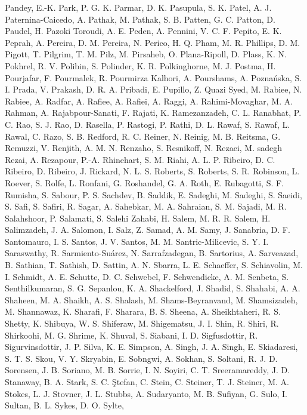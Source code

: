 \documentclass[
  letterpaper,
  DIV=11,
  numbers=noendperiod]{scrartcl}
\newlength{\cslhangindent}
\newenvironment{CSLReferences}[2] %
 {\begin{list}{}{%
  \setlength{\itemindent}{0pt}
  \setlength{\leftmargin}{0pt}
  \setlength{\parsep}{0pt}
  \ifodd #1
   \setlength{\leftmargin}{\cslhangindent}
   \setlength{\itemindent}{-1\cslhangindent}
  \fi
  \setlength{\itemsep}{#2\baselineskip}}}
 {\end{list}}
\begin{document}
\begin{CSLReferences}{0}{0}
{Pandey, E.-K. Park, P. G. K. Parmar, D. K. Pasupula, S. K. Patel, A. J.
Paternina-Caicedo, A. Pathak, M. Pathak, S. B. Patten, G. C. Patton, D.
Paudel, H. Pazoki Toroudi, A. E. Peden, A. Pennini, V. C. F. Pepito, E.
K. Peprah, A. Pereira, D. M. Pereira, N. Perico, H. Q. Pham, M. R.
Phillips, D. M. Pigott, T. Pilgrim, T. M. Pilz, M. Pirsaheb, O.
Plana-Ripoll, D. Plass, K. N. Pokhrel, R. V. Polibin, S. Polinder, K. R.
Polkinghorne, M. J. Postma, H. Pourjafar, F. Pourmalek, R. Pourmirza
Kalhori, A. Pourshams, A. Poznańska, S. I. Prada, V. Prakash, D. R. A.
Pribadi, E. Pupillo, Z. Quazi Syed, M. Rabiee, N. Rabiee, A. Radfar, A.
Rafiee, A. Rafiei, A. Raggi, A. Rahimi-Movaghar, M. A. Rahman, A.
Rajabpour-Sanati, F. Rajati, K. Ramezanzadeh, C. L. Ranabhat, P. C. Rao,
S. J. Rao, D. Rasella, P. Rastogi, P. Rathi, D. L. Rawaf, S. Rawaf, L.
Rawal, C. Razo, S. B. Redford, R. C. Reiner, N. Reinig, M. B. Reitsma,
G. Remuzzi, V. Renjith, A. M. N. Renzaho, S. Resnikoff, N. Rezaei, M.
sadegh Rezai, A. Rezapour, P.-A. Rhinehart, S. M. Riahi, A. L. P.
Ribeiro, D. C. Ribeiro, D. Ribeiro, J. Rickard, N. L. S. Roberts, S.
Roberts, S. R. Robinson, L. Roever, S. Rolfe, L. Ronfani, G. Roshandel,
G. A. Roth, E. Rubagotti, S. F. Rumisha, S. Sabour, P. S. Sachdev, B.
Saddik, E. Sadeghi, M. Sadeghi, S. Saeidi, S. Safi, S. Safiri, R. Sagar,
A. Sahebkar, M. A. Sahraian, S. M. Sajadi, M. R. Salahshoor, P.
Salamati, S. Salehi Zahabi, H. Salem, M. R. R. Salem, H. Salimzadeh, J.
A. Salomon, I. Salz, Z. Samad, A. M. Samy, J. Sanabria, D. F.
Santomauro, I. S. Santos, J. V. Santos, M. M. Santric-Milicevic, S. Y.
I. Saraswathy, R. Sarmiento-Suárez, N. Sarrafzadegan, B. Sartorius, A.
Sarveazad, B. Sathian, T. Sathish, D. Sattin, A. N. Sbarra, L. E.
Schaeffer, S. Schiavolin, M. I. Schmidt, A. E. Schutte, D. C. Schwebel,
F. Schwendicke, A. M. Senbeta, S. Senthilkumaran, S. G. Sepanlou, K. A.
Shackelford, J. Shadid, S. Shahabi, A. A. Shaheen, M. A. Shaikh, A. S.
Shalash, M. Shams-Beyranvand, M. Shamsizadeh, M. Shannawaz, K. Sharafi,
F. Sharara, B. S. Sheena, A. Sheikhtaheri, R. S. Shetty, K. Shibuya, W.
S. Shiferaw, M. Shigematsu, J. I. Shin, R. Shiri, R. Shirkoohi, M. G.
Shrime, K. Shuval, S. Siabani, I. D. Sigfusdottir, R. Sigurvinsdottir,
J. P. Silva, K. E. Simpson, A. Singh, J. A. Singh, E. Skiadaresi, S. T.
S. Skou, V. Y. Skryabin, E. Sobngwi, A. Sokhan, S. Soltani, R. J. D.
Sorensen, J. B. Soriano, M. B. Sorrie, I. N. Soyiri, C. T.
Sreeramareddy, J. D. Stanaway, B. A. Stark, S. C. Ştefan, C. Stein, C.
Steiner, T. J. Steiner, M. A. Stokes, L. J. Stovner, J. L. Stubbs, A.
Sudaryanto, M. B. Sufiyan, G. Sulo, I. Sultan, B. L. Sykes, D. O. Sylte,
}
\end{CSLReferences}
\end{document}
